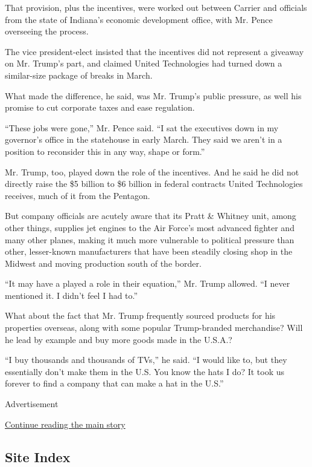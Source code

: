 That provision, plus the incentives, were worked out between Carrier and
officials from the state of Indiana's economic development office, with
Mr. Pence overseeing the process.

The vice president-elect insisted that the incentives did not represent
a giveaway on Mr. Trump's part, and claimed United Technologies had
turned down a similar-size package of breaks in March.

What made the difference, he said, was Mr. Trump's public pressure, as
well his promise to cut corporate taxes and ease regulation.

``These jobs were gone,'' Mr. Pence said. ``I sat the executives down in
my governor's office in the statehouse in early March. They said we
aren't in a position to reconsider this in any way, shape or form.''

Mr. Trump, too, played down the role of the incentives. And he said he
did not directly raise the \$5 billion to \$6 billion in federal
contracts United Technologies receives, much of it from the Pentagon.

But company officials are acutely aware that its Pratt \& Whitney unit,
among other things, supplies jet engines to the Air Force's most
advanced fighter and many other planes, making it much more vulnerable
to political pressure than other, lesser-known manufacturers that have
been steadily closing shop in the Midwest and moving production south of
the border.

``It may have a played a role in their equation,'' Mr. Trump allowed.
``I never mentioned it. I didn't feel I had to.''

What about the fact that Mr. Trump frequently sourced products for his
properties overseas, along with some popular Trump-branded merchandise?
Will he lead by example and buy more goods made in the U.S.A.?

``I buy thousands and thousands of TVs,'' he said. ``I would like to,
but they essentially don't make them in the U.S. You know the hats I do?
It took us forever to find a company that can make a hat in the U.S.''

Advertisement

\protect\hyperlink{after-bottom}{Continue reading the main story}

\hypertarget{site-index}{%
\subsection{Site Index}\label{site-index}}

